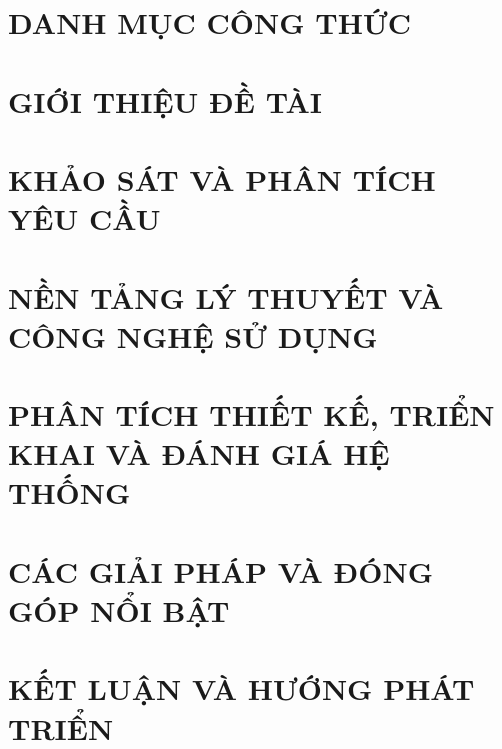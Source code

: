 \documentclass[a4paper,13pt,3p,twoside]{report}
\makeatletter
\newcommand{\listequationname}{DANH MỤC CÔNG THỨC}
\newcommand{\listofequations}{%
  \chapter*{\listequationname}%
  \@starttoc{loe}%
}
\theoremstyle{definition}
\makeatother
\begin{document}
\newpage
{\let\oldnumberline\numberline%
\renewcommand{\numberline}{Công thức~\oldnumberline}
\listofequations}

\newpage


\newpage



\newpage
{}

\pagestyle{fancy}
\fancyhf{}
\fancyhead[RE, LO]{\leftmark}
\fancyfoot[RE, LO]{\thepage}

\chapter{GIỚI THIỆU ĐỀ TÀI}%
\label{chapter:Introduction}

\newpage
\chapter{KHẢO SÁT VÀ PHÂN TÍCH YÊU CẦU}%
\label{chapter:Related_works}



\newpage
\chapter{NỀN TẢNG LÝ THUYẾT VÀ CÔNG NGHỆ SỬ DỤNG}%
\label{chapter:Methodology}


\newpage
\chapter{PHÂN TÍCH THIẾT KẾ, TRIỂN KHAI VÀ ĐÁNH GIÁ HỆ THỐNG}%
\label{chapter:Experiment}


\newpage
\chapter{CÁC GIẢI PHÁP VÀ ĐÓNG GÓP NỔI BẬT}%
\label{chapter:SolutionAndContribution}

\newpage
\chapter{KẾT LUẬN VÀ HƯỚNG PHÁT TRIỂN}%
\label{chapter:conclusion}

\end{document}
